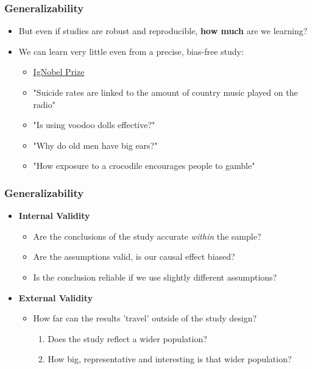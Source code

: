 \documentclass[xcolor=x11names,compress]{beamer}\usepackage[]{graphicx}\usepackage[]{color}
\renewcommand{\(}{\begin{columns}}
\renewcommand{\)}{\end{columns}}
\newcommand{\<}[1]{\begin{column}{#1}}
\renewcommand{\>}{\end{column}}
\begin{document}
\begin{frame}
\frametitle{Generalizability}
\begin{itemize}
\item But even if studies are robust and reproducible, \textbf{how much} are we learning?
\item We can learn very little even from a precise, bias-free study:
\begin{itemize}
\item \href{https://www.improbable.com/ig/winners}{IgNobel Prize}
\item "Suicide rates are linked to the amount of country music played on the radio"
\item "Is using voodoo dolls effective?"
\item "Why do old men have big ears?"
\item "How exposure to a crocodile encourages people to gamble"
\end{itemize}
\end{itemize}
\end{frame}

\begin{frame}
\frametitle{Generalizability}
\begin{itemize}
\item \textbf{Internal Validity}
\begin{itemize}
\item Are the conclusions of the study accurate \textit{within} the sample?
\item Are the assumptions valid, is our causal effect biased?
\item Is the conclusion reliable if we use slightly different assumptions?
\end{itemize}
\item \textbf{External Validity}
\begin{itemize}
\item How far can the results 'travel' outside of the study design?
\begin{enumerate}
\item Does the study reflect a wider population?
\item How big, representative and interesting is that wider population?
\end{enumerate}
\end{itemize}
\end{itemize}
\end{frame}
\end{document}
